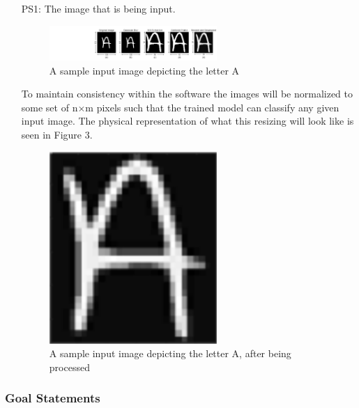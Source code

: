 \documentclass[12pt]{article}
\begin{document}
\begin{itemize}

\item[PS1:] The image that is being input.

\begin{figure}[h!]
  \begin{center}
   \includegraphics[width=0.6\textwidth]{physicalsystempreprocessing}
  \caption{A sample input image depicting the letter A}
  \label{Fig_PSPreproccessing} 
  \end{center}
  \end{figure}

  To maintain consistency within the software the images will be normalized to some set of n$\times$m pixels such that
  the trained model can classify any given input image. The physical representation of what this resizing will look like
  is seen in Figure 3.

  \begin{figure}[h!]
    \begin{center}
     \includegraphics[width=0.6\textwidth]{physicalsystem}
    \caption{A sample input image depicting the letter A, after being processed}
    \label{Fig_PS} 
    \end{center}
    \end{figure}


\end{itemize}

\subsubsection{Goal Statements}
\end{document}

